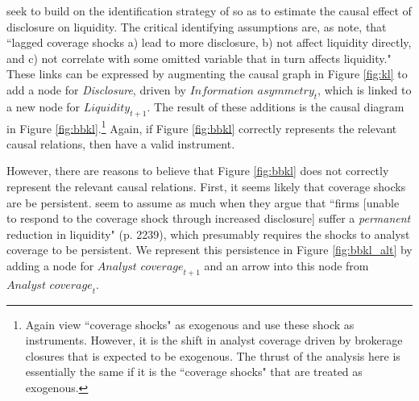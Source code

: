\documentclass[11pt,reqno,titlepage]{amsart}
\begin{document}
\begin{doublespace}
\citet{Balakrishnan:2014js} seek to build on the identification strategy of  \citet{Kelly:2012ih} so  as to estimate the causal effect of disclosure on liquidity.
The critical identifying assumptions are, as \citet{Balakrishnan:2014js}  note, that ``lagged coverage shocks a) lead to more disclosure, b) not affect liquidity directly, and c) not correlate with some omitted variable that in turn affects liquidity."
These links can be expressed by augmenting the causal graph in Figure \ref{fig:kl} to add a node for \textit{Disclosure}, driven by $\textit{Information asymmetry}_t$, which is linked to a new node for $\textit{Liquidity}_{t+1}$. 
The result of these additions is the causal diagram in  Figure \ref{fig:bbkl}.\footnote{
 Again \citet{Balakrishnan:2014js} view ``coverage shocks" as exogenous and use these shock as instruments. However, it is the shift in analyst coverage driven by brokerage closures that is expected to be exogenous.
The thrust of the analysis here is essentially the same if it is the ``coverage shocks" that are treated as exogenous.}
Again, if Figure \ref{fig:bbkl} correctly represents the relevant causal relations, then \citet{Balakrishnan:2014js} have a valid instrument.

However, there are reasons to believe that Figure \ref{fig:bbkl} does not correctly represent the relevant causal relations.
First, it seems likely that coverage shocks are be persistent. \citet{Balakrishnan:2014js} seem to  assume as much when they argue that ``firms [unable to respond  to the coverage shock through increased disclosure] suffer a \emph{permanent} reduction in liquidity" (p. 2239), which presumably requires the shocks to analyst coverage to be persistent.
We represent this persistence in Figure \ref{fig:bbkl_alt} by adding a node for $\textit{Analyst coverage}_{t+1}$ and an arrow into this node from $\textit{Analyst coverage}_t$.


\end{doublespace}
\end{document}
